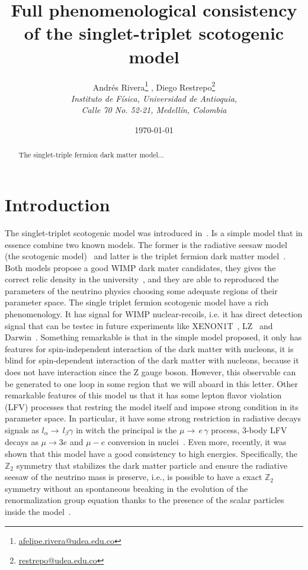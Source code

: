 \documentclass[12pt,letterpaper]{article}
\title{
Full phenomenological consistency of the singlet-triplet scotogenic model
}
\author{ 
    Andrés Rivera\footnote{\href{mailto:afelipe.rivera@udea.edu.co}{afelipe.rivera@udea.edu.co}}
   , Diego Restrepo\footnote{\href{mailto:restrepo@udea.edu.co}{restrepo@udea.edu.co}}
    \\
\textit{\small  Instituto de F\'{i}sica, Universidad de Antioquia,} \\
\textit{\small  Calle 70 No. 52-21, Medell\'{i}n, Colombia}
}
\date{\small \today}
\begin{document}
\maketitle
\begin{abstract}
The singlet-triple fermion dark matter model...

\end{abstract}



\section{Introduction}



The singlet-triplet scotogenic model was introduced in~\cite{Hirsch:2013ola}.
Is a simple model that in essence combine two known models. The former is the radiative seesaw model (the scotogenic model)~\cite{Ma:2006km} and latter is the triplet fermion dark matter model~\cite{Ma:2008cu}. Both models propose a good WIMP dark mater candidates, they gives the correct relic density in the university~\cite{Aghanim:2018eyx}, and they are able to reproduced the parameters of the neutrino physics choosing some adequate regions of their parameter space. 
The single triplet fermion scotogenic model have a rich phenomenology. 
It has signal for WIMP nuclear-recoils, i.e. it has direct detection signal that can be testec in future experiments like XENON1T~\cite{Aprile:2018dbl}, LZ~\cite{Mount:2017qzi} and Darwin~\cite{Aalbers:2016jon}. Something remarkable is that in the simple model proposed, it only has features for spin-independent interaction of the dark matter with nucleons, it is blind for spin-dependent interaction of the dark matter with nucleons, because it does not have interaction since the Z gauge boson. However, this observable can be generated to one loop in some region that we will aboard in this letter.
%
Other remarkable features of this model us that it has some lepton flavor violation (LFV) processes that restring the model itself and impose strong condition in its parameter space. In particular, it have some strong restriction in radiative decays signals as $l_{\alpha}\to\,l_{\beta}\gamma$ in witch the principal is the $\mu\to\,e\,\gamma$ process, 3-body LFV decays as $\mu\to 3 e$ and $\mu - e$ conversion in nuclei~\cite{Rocha-Moran:2016enp}.  
%
Even more, recently, it was shown that this model have a good consistency to high energies. Specifically, the $\mathbb{Z}_2$ symmetry that stabilizes the dark matter particle and ensure the radiative seesaw of the neutrino mass is preserve, i.e., is possible to have a exact $\mathbb{Z}_2$ symmetry without an spontaneous breaking in the evolution of the renormalization group equation thanks to the presence of the scalar particles inside the model~\cite{Merle:2016scw}.
\end{document}
